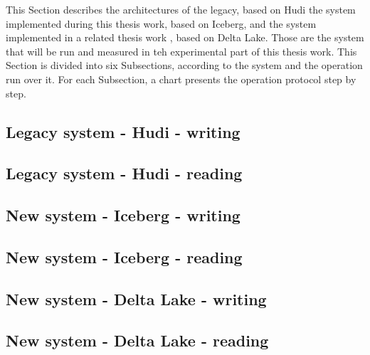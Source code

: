 This Section describes the architectures of the legacy, based on Hudi the system implemented during this thesis work, based on Iceberg, and the system implemented in a related thesis work \cite{manfrediReducingReadWrite2024}, based on Delta Lake. Those are the system that will be run and measured in teh experimental part of this thesis work. This Section is divided into six Subsections, according to the system and the operation run over it. For each Subsection, a chart presents the operation protocol step by step.

\subsection{Legacy system - Hudi - writing}
\subsection{Legacy system - Hudi - reading}
\subsection{New system - Iceberg - writing}
\subsection{New system - Iceberg - reading}
\subsection{New system - Delta Lake - writing}
\subsection{New system - Delta Lake - reading}